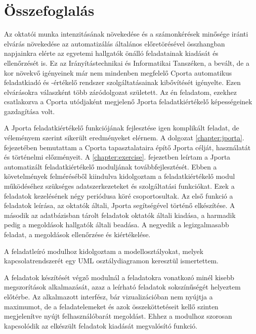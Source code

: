 \chapter*{Összefoglalás}

Az oktatói munka intenzitásának növekedése és a számonkérések minősége iránti elvárás növekedése az automatizálás általános előretörésével összhangban napjainkra elérte az egyetemi hallgatók önálló feladatainak kiadását és ellenőrzését is.
Ez az Irányítástechnikai és Informatikai Tanszéken, a bevált, de a kor növekvő igényeinek már nem mindenben megfelelő Cporta automatikus feladatkiadó és -értékelő rendszer szolgáltatásainak kibővítését igényelte.
Ezen elvárásokra válaszként több záródolgozat született.
Az én feladatom, ezekhez csatlakozva a Cporta utódjaként megjelenő Jporta feladatkiértékelő képességeinek gazdagítása volt.

A Jporta feladatkiértékelő funkciójának fejlesztése igen komplikált feladat, de véleményem szerint sikerült eredményeket elérnem.
A dolgozat \ref{chapter:jporta}. fejezetében bemutattam a Cporta tapasztalataira építő Jporta célját, használatát és történelmi előzményeit.
A \ref{chapter:exercise}. fejezetben leírtam a Jporta automatizált feladatkiértékelő moduljának továbbfejlesztését.
Ebben a követelmények felméréséből kiindulva kidolgoztam a feladatkiértékelő modul működéséhez szükséges adatszerkezeteket és szolgáltatási funkciókat.
Ezek a feladatok kezelésének négy periódusa köré csoportosultak.
Az első funkció a feladatok leírása, az oktatók általi, Jporta segítségével történő elkészítése.
A második az adatbázisban tárolt feladatok oktatók általi kiadása, a harmadik pedig a megoldások hallgatók általi beadása.
A negyedik a legizgalmasabb feladat, a megoldások ellenőrzése és kiértékelése.

A feladatleíró modulhoz kidolgoztam a modellosztályokat, melyek kapcsolatrendszerét egy UML osztálydiagramon keresztül ismertettem.

A feladatok készítését végző modulnál a feladatokra vonatkozó minél kisebb megszorítások alkalmazását, azaz a leírható feladatok sokszínűségét helyeztem előtérbe.
Az alkalmazott interfész, bár vizualizációban nem nyújtja a maximumot, de a feladatelemeket és azok összeköttetéseit kellő szinten megjelenítve nyújt felhasználóbarát megoldást.
Ehhez a modulhoz szorosan kapcsolódik az elkészült feladatok kiadását megvalósító funkció.

